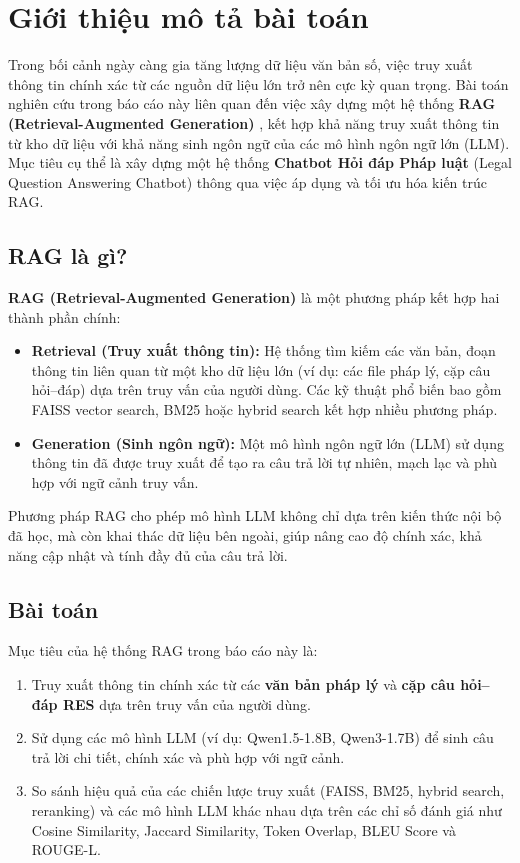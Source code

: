 \section{Giới thiệu mô tả bài toán}

Trong bối cảnh ngày càng gia tăng lượng dữ liệu văn bản số, việc truy xuất thông tin chính xác từ các nguồn dữ liệu lớn trở nên cực kỳ quan trọng. Bài toán nghiên cứu trong báo cáo này liên quan đến việc xây dựng một hệ thống \textbf{RAG (Retrieval-Augmented Generation)} \cite{lewis2020rag}, kết hợp khả năng truy xuất thông tin từ kho dữ liệu với khả năng sinh ngôn ngữ của các mô hình ngôn ngữ lớn (LLM). Mục tiêu cụ thể là xây dựng một hệ thống \textbf{Chatbot Hỏi đáp Pháp luật} (Legal Question Answering Chatbot) thông qua việc áp dụng và tối ưu hóa kiến trúc RAG.

\subsection{RAG là gì?}

\textbf{RAG (Retrieval-Augmented Generation)} là một phương pháp kết hợp hai thành phần chính:

\begin{itemize}
  \item \textbf{Retrieval (Truy xuất thông tin):} Hệ thống tìm kiếm các văn bản, đoạn thông tin liên quan từ một kho dữ liệu lớn (ví dụ: các file pháp lý, cặp câu hỏi--đáp) dựa trên truy vấn của người dùng. Các kỹ thuật phổ biến bao gồm FAISS vector search\cite{johnson2017faiss}, BM25 hoặc hybrid search\cite{robertson1994bm25} kết hợp nhiều phương pháp.

  \item \textbf{Generation (Sinh ngôn ngữ):} Một mô hình ngôn ngữ lớn (LLM) sử dụng thông tin đã được truy xuất để tạo ra câu trả lời tự nhiên, mạch lạc và phù hợp với ngữ cảnh truy vấn.
\end{itemize}

Phương pháp RAG cho phép mô hình LLM không chỉ dựa trên kiến thức nội bộ đã học, mà còn khai thác dữ liệu bên ngoài, giúp nâng cao độ chính xác, khả năng cập nhật và tính đầy đủ của câu trả lời.

\subsection{Bài toán}

Mục tiêu của hệ thống RAG trong báo cáo này là:

\begin{enumerate}
  \item Truy xuất thông tin chính xác từ các \textbf{văn bản pháp lý} và \textbf{cặp câu hỏi--đáp RES} dựa trên truy vấn của người dùng.
  \item Sử dụng các mô hình LLM (ví dụ: Qwen1.5-1.8B, Qwen3-1.7B) để sinh câu trả lời chi tiết, chính xác và phù hợp với ngữ cảnh.
  \item So sánh hiệu quả của các chiến lược truy xuất (FAISS, BM25, hybrid search, reranking) và các mô hình LLM khác nhau dựa trên các chỉ số đánh giá như Cosine Similarity, Jaccard Similarity, Token Overlap, BLEU Score và ROUGE-L.
\end{enumerate}

